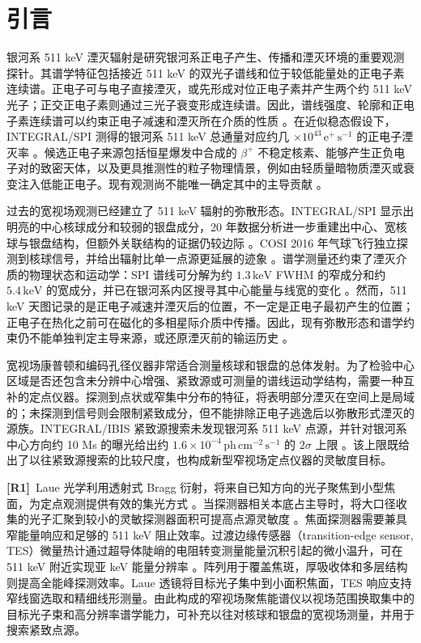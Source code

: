 \documentclass[11pt]{article}
\newcommand{\revmark}[1]{\textcolor{revisionblue}{\textbf{[R#1]}}\ }
\newcommand{\keV}{\,\mathrm{keV}}
\newcommand{\phcms}{\,\mathrm{ph\,cm^{-2}\,s^{-1}}}
\begin{document}
\section{引言}
\label{sec:intro}

银河系 511 keV 湮灭辐射是研究银河系正电子产生、传播和湮灭环境的重要观测探针。其谱学特征包括接近 511 keV 的双光子谱线和位于较低能量处的正电子素连续谱。正电子可与电子直接湮灭，或先形成对位正电子素并产生两个约 511 keV 光子；正交正电子素则通过三光子衰变形成连续谱。因此，谱线强度、轮廓和正电子素连续谱可以约束正电子减速和湮灭所在介质的性质 \cite{Prantzos2011,Jean2006}。在近似稳态假设下，INTEGRAL/SPI 测得的银河系 511 keV 总通量对应约几 $\times10^{43}\,\mathrm{e^+\,s^{-1}}$ 的正电子湮灭率 \cite{Prantzos2011,Kierans2020}。候选正电子来源包括恒星爆发中合成的 $\beta^+$ 不稳定核素、能够产生正负电子对的致密天体，以及更具推测性的粒子物理情景，例如由轻质量暗物质湮灭或衰变注入低能正电子。现有观测尚不能唯一确定其中的主导贡献 \cite{Prantzos2011,Siegert2016AA,Siegert2016V404}。

过去的宽视场观测已经建立了 511 keV 辐射的弥散形态。INTEGRAL/SPI 显示出明亮的中心核球成分和较弱的银盘成分，20 年数据分析进一步重建出中心、宽核球与银盘结构，但额外关联结构的证据仍较边际 \cite{Knodlseder2005AllSky,Siegert2016AA,Yoneda2025}。COSI 2016 年气球飞行独立探测到核球信号，并给出辐射比单一点源更延展的迹象 \cite{Kierans2020,Siegert2020COSI}。谱学测量还约束了湮灭介质的物理状态和运动学：SPI 谱线可分解为约 $1.3\keV$ FWHM 的窄成分和约 $5.4\keV$ 的宽成分，并已在银河系内区搜寻其中心能量与线宽的变化 \cite{Jean2006,Siegert2019Kinematics}。然而，511 keV 天图记录的是正电子减速并湮灭后的位置，不一定是正电子最初产生的位置；正电子在热化之前可在磁化的多相星际介质中传播。因此，现有弥散形态和谱学约束仍不能单独判定主导来源，或还原湮灭前的输运历史 \cite{Prantzos2011}。

宽视场康普顿和编码孔径仪器非常适合测量核球和银盘的总体发射。为了检验中心区域是否还包含未分辨中心增强、紧致源或可测量的谱线运动学结构，需要一种互补的定点仪器。探测到点状或窄集中分布的特征，将表明部分湮灭在空间上是局域的；未探测到信号则会限制紧致成分，但不能排除正电子逃逸后以弥散形式湮灭的源族。INTEGRAL/IBIS 紧致源搜索未发现银河系 511 keV 点源，并针对银河系中心方向约 10 Ms 的曝光给出约 $1.6\times10^{-4}\phcms$ 的 $2\sigma$ 上限 \cite{DeCesare2011}。该上限既给出了以往紧致源搜索的比较尺度，也构成新型窄视场定点仪器的灵敏度目标。

\revmark{1}Laue 光学利用透射式 Bragg 衍射，将来自已知方向的光子聚焦到小型焦面，为定点观测提供有效的集光方式 \cite{Barriere2009Laue,Barriere2011LauePrototype}。当探测器相关本底占主导时，将大口径收集的光子汇聚到较小的灵敏探测器面积可提高点源灵敏度 \cite{Weidenspointner2006MAX}。焦面探测器需要兼具窄能量响应和足够的 511 keV 阻止效率。过渡边缘传感器（transition-edge sensor, TES）微量热计通过超导体陡峭的电阻转变测量能量沉积引起的微小温升，可在 511 keV 附近实现亚 keV 能量分辨率 \cite{Shirazi2023,Zhang2022TESGamma}。阵列用于覆盖焦斑，厚吸收体和多层结构则提高全能峰探测效率。Laue 透镜将目标光子集中到小面积焦面，TES 响应支持窄线窗选取和精细线形测量。由此构成的窄视场聚焦能谱仪以视场范围换取集中的目标光子束和高分辨率谱学能力，可补充以往对核球和银盘的宽视场测量，并用于搜索紧致点源。
\end{document}
